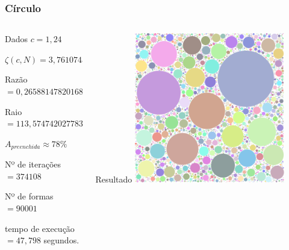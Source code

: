 \documentclass[aspectratio=169]{beamer}
\begin{document}
\begin{frame}
\frametitle{Círculo}

\begin{columns}[T]
\begin{column}{.5\textwidth}
\begin{block}{\centering Dados}
$c=1,24$
\smallskip

$\zeta(c,N)=3,7610743206468737$
\smallskip

Razão $=0,26588147820168795$
\smallskip

Raio $=113,57474202778332$
\smallskip

$A_{preenchida} \approx 78\%$
\smallskip

Nº de iterações $=374108$
\smallskip

Nº de formas $=90001$
\smallskip

tempo de execução $= 47,798$ segundos.
\smallskip
\end{block}
\end{column}

\begin{column}{.5\textwidth}
\begin{block}{\centering Resultado}
\centering
\includegraphics[width=0.7\textwidth]{exemplo3}
\end{block}
\end{column}
\end{columns}

\end{frame}
\end{document}
